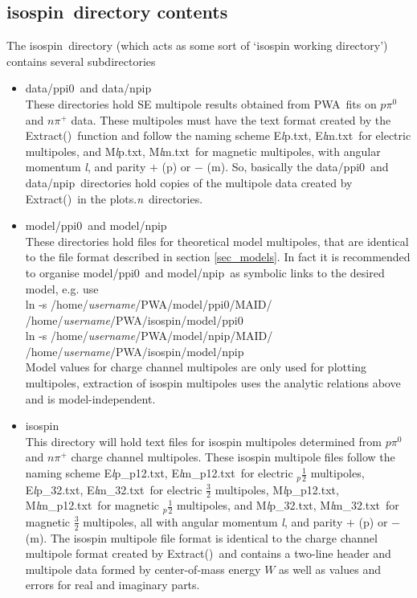 \documentclass[a4paper,10pt]{article}
\def\PWA{\ttfamily PWA\rmfamily\ }
\def\tt{\ttfamily}
\def\rm{\rmfamily}
\begin{document}
\subsection{\tt isospin\rm\ directory contents}

The \tt isospin\rm\ directory (which acts as some sort of `isospin working directory') contains several subdirectories
\begin{itemize}
\item
\tt data/ppi0\rm\ and \tt data/npip\rm\\
These directories hold SE multipole results obtained from \PWA fits on $p\pi^0$ and $n\pi^+$ data. These multipoles
must have the text format created by the \tt Extract()\rm\ function and follow the naming scheme
\tt E\textit{l}p.txt\rm,
\tt E\textit{l}m.txt\rm\ 
for electric multipoles, and
\tt M\textit{l}p.txt\rm,
\tt M\textit{l}m.txt\rm\ 
for magnetic multipoles, with angular momentum \tt\textit{l}\rm, and parity
$+$ (\tt p\rm) or $-$ (\tt m\rm).
So, basically the \tt data/ppi0\rm\ and \tt data/npip\rm\ directories hold copies of the multipole data created
by \tt Extract()\rm\ in the \tt plots.\textit{n}\rm\ directories.
\item
\tt model/ppi0\rm\ and \tt model/npip\rm\\
These directories hold files for theoretical model multipoles, that are identical to the file format described in section
\ref{sec_models}. In fact it is recommended to organise \tt model/ppi0\rm\ and \tt model/npip\rm\ as
symbolic links to the desired model, e.g. use\\
\tt ln -s /home/\textit{username}/PWA/model/ppi0/MAID/ /home/\textit{username}/PWA/isospin/model/ppi0\rm\\
\tt ln -s /home/\textit{username}/PWA/model/npip/MAID/ /home/\textit{username}/PWA/isospin/model/npip\rm\\
Model values for charge channel multipoles are only used for plotting multipoles, extraction
of isospin multipoles uses the analytic relations above and is model-independent.
\item 
\tt isospin\rm\\
This directory will hold text files for isospin multipoles determined from $p\pi^0$ and $n\pi^+$ charge
channel multipoles. These isospin multipole files follow the naming scheme
\tt E\textit{l}p\_p12.txt\rm,
\tt E\textit{l}m\_p12.txt\rm\ 
for electric $_p\frac{1}{2}$ multipoles,
\tt E\textit{l}p\_32.txt\rm,
\tt E\textit{l}m\_32.txt\rm\ 
for electric $\frac{3}{2}$ multipoles,
\tt M\textit{l}p\_p12.txt\rm,
\tt M\textit{l}m\_p12.txt\rm\ 
for magnetic $_p\frac{1}{2}$ multipoles, and
\tt M\textit{l}p\_32.txt\rm,
\tt M\textit{l}m\_32.txt\rm\ 
for magnetic $\frac{3}{2}$ multipoles,
all with angular momentum \tt\textit{l}\rm, and parity
$+$ (\tt p\rm) or $-$ (\tt m\rm).
The isospin multipole file format is identical to the charge channel multipole format created by \tt Extract()\rm\
and contains a two-line header and multipole data formed by
center-of-mass energy $W$ as well as values and errors for real and imaginary parts.

\end{itemize}
\end{document}
